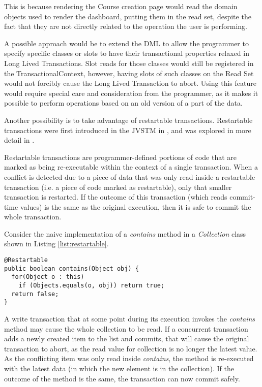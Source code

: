 This is because rendering the Course creation page would read the
domain objects used to render the dashboard, putting them in the read
set, despite the fact that they are not directly related to the
operation the user is performing.

A possible approach would be to extend the DML to allow the programmer
to specify specific classes or slots to have their transactional
properties relaxed in Long Lived Transactions.  Slot reads for those
classes would still be registered in the TransactionalContext,
however, having slots of such classes on the Read Set would not
forcibly cause the Long Lived Transaction to abort.  Using this
feature would require special care and consideration from the
programmer, as it makes it possible to perform operations based on an
old version of a part of the data.

Another possibility is to take advantage of restartable
transactions. Restartable transactions were first introduced in the
JVSTM in \cite{cachopo2006versioned}, and was explored in more detail
in \cite{BrunoJorgeGasparFranco2013}.

Restartable transactions are programmer-defined portions of code that
are marked as being re-executable within the context of a single
transaction. When a conflict is detected due to a piece of data that
was only read inside a restartable transaction (i.e. a piece of code
marked as restartable), only that smaller transaction is restarted. If
the outcome of this transaction (which reads commit-time values) is
the same as the original execution, then it is safe to commit the
whole transaction.

Consider the naive implementation of a {\it contains} method in a {\it
  Collection} class shown in Listing \ref{list:restartable}.

\begin{lstlisting}[caption={Restartable {\it contains} method},
  label={list:restartable}]
@Restartable
public boolean contains(Object obj) {
  for(Object o : this)
    if (Objects.equals(o, obj)) return true;
  return false;
}
\end{lstlisting}

A write transaction that at some point during its execution invokes
the {\it contains} method may cause the whole collection to be read.
If a concurrent transaction adds a newly created item to the list and
commits, that will cause the original transaction to abort, as the
read value for collection is no longer the latest value.  As the
conflicting item was only read inside {\it contains}, the method is
re-executed with the latest data (in which the new element is in the
collection). If the outcome of the method is the same, the transaction
can now commit safely.

